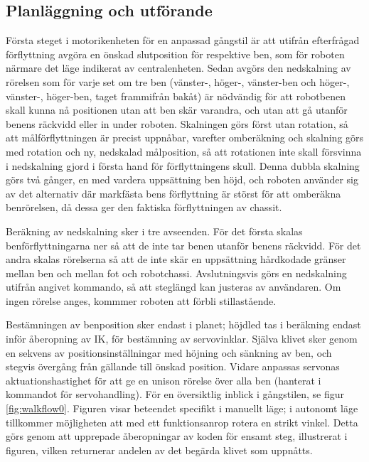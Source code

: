 \documentclass[a4paper,titlepage,12pt]{article}
\begin{document}
		\subsection{Planläggning och utförande}
	Första steget i motorikenheten för en anpassad gångstil är att utifrån efterfrågad
	förflyttning avgöra en önskad slutposition för respektive ben, som för roboten närmare 
	det läge indikerat av centralenheten. Sedan avgörs den nedskalning av rörelsen som för 
	varje set om tre ben (vänster-, höger-, vänster-ben och höger-, vänster-, höger-ben, taget 
	frammifrån bakåt) är nödvändig för att robotbenen skall kunna nå positionen utan att ben 
        skär varandra, och utan att gå utanför benens räckvidd eller in under roboten. Skalningen 
        görs först utan rotation, så att målförflyttningen är precist uppnåbar, varefter omberäkning 
        och skalning görs med rotation och ny, nedskalad målposition, så att rotationen inte skall 
        försvinna i nedskalning gjord i första hand för förflyttningens skull. Denna dubbla skalning 
        görs två gånger, en med vardera uppsättning ben höjd, och roboten använder sig av det 
        alternativ där markfästa bens förflyttning är störst för att omberäkna benrörelsen, då dessa 
        ger den faktiska förflyttningen av chassit. 

	Beräkning av nedskalning sker i tre avseenden. För det första skalas benförflyttningarna 
	ner så att de inte tar benen utanför benens räckvidd. För det andra skalas  rörelserna så 
	att de inte skär en uppsättning hårdkodade gränser mellan ben och mellan fot och robotchassi.
	Avslutningsvis görs en nedskalning utifrån angivet kommando, så att steglängd kan justeras av 
	användaren. Om ingen rörelse anges, kommmer roboten att förbli stillastående. %

	Bestämningen av benposition sker endast i planet; höjdled tas i beräkning endast inför åberopning 
	av IK, för bestämning av servovinklar. Själva klivet sker genom en sekvens av 
	positionsinställningar med höjning och sänkning av ben, och stegvis övergång från gällande till 
	önskad position. Vidare anpassas servonas aktuationshastighet för att ge en unison rörelse 
	över alla ben (hanterat i kommandot för servohandling). För en översiktlig inblick i 
	gångstilen, se figur \ref{fig:walkflow0}. Figuren visar beteendet specifikt i manuellt läge;
	i autonomt läge tillkommer möjligheten att med ett funktionsanrop rotera en strikt vinkel.
	Detta görs genom att upprepade åberopningar av koden för ensamt steg, illustrerat i figuren, 
	vilken returnerar andelen av det begärda klivet som uppnåtts.
	
\end{document}
